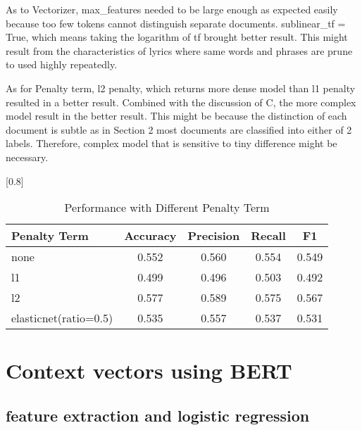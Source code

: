 \documentclass[a4paper,11pt]{article}
\begin{document}
As to Vectorizer, max\_features needed to be large enough as expected easily because too few tokens cannot distinguish separate documents.
sublinear\_tf = True, which means taking the logarithm of tf brought better result.
This might result from the characteristics of lyrics where same words and phrases are prune to used highly repeatedly.

As for Penalty term, l2 penalty, which returns more dense model than l1 penalty resulted in a better result.
Combined with the discussion of C, the more complex model result in the better result.
This might be because the distinction of each document is subtle as in Section 2 most documents are classified into either of 2 labels.
Therefore, complex model that is sensitive to tiny difference might be necessary.




\begin{table}[htbp]
    \centering
    \caption{Performance with Different Penalty Term}
    \small
    \scalebox{0.8}[0.8]{
    \begin{tabular}{l|cccc}
        Penalty Term & Accuracy & Precision & Recall & F1 \\ \hline 
        none & 0.552 & 0.560 & 0.554 & 0.549 \\ 
        l1 & 0.499 & 0.496 & 0.503 & 0.492 \\
        \rowcolor[rgb]{0.9,0.9,0}l2 & 0.577 & 0.589 & 0.575 & 0.567 \\
        elasticnet(ratio=0.5) & 0.535 & 0.557 & 0.537 & 0.531 \\



    \end{tabular}

    }
\end{table}

\section{Context vectors using BERT}

\subsection{feature extraction and logistic regression}
\end{document}
